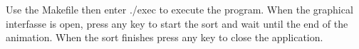 Use the Makefile then enter ./exec to execute the program. When the graphical interfasse is open, press any key to start the sort and wait until the end of the animation. When the sort finishes press any key to close the application. 